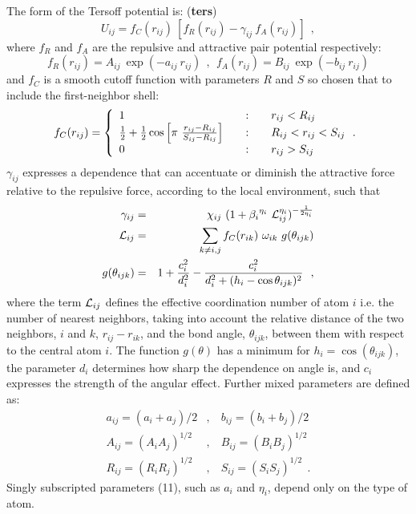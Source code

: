 The form of the Tersoff potential is:  ({\bf ters})
\begin{equation}
U_{ij} = f_{C}(r_{ij})~[f_{R}(r_{ij}) - \gamma_{ij}~f_{A}(r_{ij})]~~,
\end{equation}
where $f_{R}$ and $f_{A}$ are the repulsive and attractive pair
potential respectively:
\begin{equation}
f_{R}(r_{ij}) = A_{ij}~\exp(- a_{ij}~r_{ij})~~,~~
f_{A}(r_{ij}) = B_{ij}~\exp(- b_{ij}~r_{ij})
\end{equation}
and $f_{C}$ is a smooth cutoff function with parameters $R$ and $S$
so chosen that to include the first-neighbor shell:
\begin{equation}
f_{C}(r_{ij}) = \left\{ \begin{array} {l@{\qquad:\qquad}l}
1 & r_{ij} < R_{ij} \\
\frac{1}{2} + \frac{1}{2} \cos \left[\pi~\frac{r_{ij}-R_{ij}}{S_{ij}-R_{ij}}\right]
& R_{ij} < r_{ij} < S_{ij}~~. \\
0 & r_{ij} > S_{ij}
\end{array} \right.
\end{equation}
$\gamma_{ij}$ expresses a dependence that can accentuate or diminish
the attractive force relative to the repulsive force, according to
the local environment, such that
\begin{eqnarray}
\gamma_{ij} &=& \chi_{ij}~(1 + {\beta_{i}}^{\eta_{i}}~{\cal{L}}_{ij}^{\eta_{i}})^{-\frac{1}{2\eta_{i}}} \nonumber \\
{\cal{L}}_{ij} &=& \sum_{k \neq i,j} f_{C}(r_{ik})~\omega_{ik}~g(\theta_{ijk}) \\
g(\theta_{ijk}) &=& 1 + \frac{c_{i}^{2}}{d_{i}^{2}} - \frac{c_{i}^{2}}{d_{i}^{2} + (h_{i} - \cos\theta_{ijk})^{2}}~~, \nonumber
\end{eqnarray}
where the term ${\cal{L}}_{ij}$ defines the effective coordination
number of atom $i$ i.e. the number of nearest neighbors, taking into
account the relative distance of the two neighbors, $i$ and $k$,
$r_{ij}-r_{ik}$, and the bond angle, $\theta_{ijk}$, between them
with respect to the central atom $i$.  The function $g(\theta)$ has
a minimum for $h_{i}=\cos(\theta_{ijk})$, the parameter $d_{i}$
determines how sharp the dependence on angle is, and $c_{i}$
expresses the strength of the angular effect.  Further mixed
parameters are defined as:
\begin{eqnarray}
a_{ij} = (a_{i} + a_{j})/2&,&~b_{ij} = (b_{i} + b_{j})/2 \nonumber \\
A_{ij} = (A_{i} A_{j})^{1/2}&,&~B_{ij} = (B_{i} B_{j})^{1/2} \\
R_{ij} = (R_{i} R_{j})^{1/2}&,&~S_{ij} = (S_{i} S_{j})^{1/2}~~.
\nonumber
\end{eqnarray}
Singly subscripted parameters (11), such as $a_{i}$ and $\eta_{i}$,
depend only on the type of atom.

